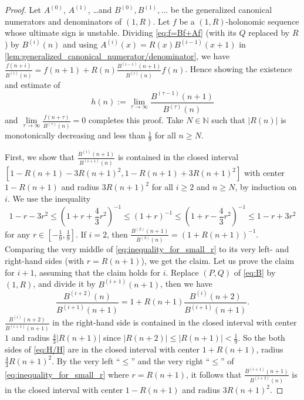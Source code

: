 \documentclass[a4paper,UKenglish,cleveref,autoref,thm-restate]{lipics-v2021}
\newcommand{\N}{\mathbb{N}}
\begin{document}
\begin{proof}
Let $A^{(0)}$, $A^{(1)}$, \dots and $B^{(0)}, B^{(1)}, \dots$ be the generalized canonical numerators and denominators of $(1,R)$. Let $f$ be a $(1, R)$-holonomic sequence whose ultimate sign is unstable. 
Dividing \cref{eq:f=Bf+Af} (with its $Q$ replaced by $R$) by $B^{(i)}(n)$ and using $A^{(i)}(x) = R(x) B^{(i-1)}(x+1)$ in \cref{lem:generalized_canonical_numerator/denominator}, we have $\frac{f(n+i)}{B^{(i)}(n)} = f(n+1) + R(n) \frac{B^{(i-1)}(n+1)}{B^{(i)}(n)} f(n)$. 
Hence showing the existence and estimate of
\begin{equation}\label{eq:h}
h(n) := \lim_{\tau \to \infty} \frac{B^{(\tau-1)}(n+1)}{B^{(\tau)}(n)}
\end{equation}
and $\lim\limits_{\tau \to \infty} \frac{f(n+\tau)}{B^{(\tau)}(n)} = 0$ completes this proof. Take $N \in \N$ such that $|R(n)|$ is monotonically decreasing and less than $\frac19$ for all $n \geq N$. 


First, we show that $\frac{B^{(i)}(n+1)}{B^{(i+1)}(n)}$ is contained in the closed interval $[ 1-R(n+1) - 3R(n+1)^2, 1-R(n+1) + 3R(n+1)^2 ]$ with center $1 - R(n+1)$ and radius $3R(n+1)^2$ for all $i \geq 2$ and $n \geq N$, by induction on $i$. We use the inequality
\begin{equation} \label{eq:inequality_for_small_r}
1 - r - 3r^2 \leq \left( 1+r+\frac43 r^2 \right)^{-1} \leq (1+r)^{-1} \leq \left( 1+r-\frac43 r^2 \right)^{-1} \leq 1 - r + 3r^2
\end{equation}
for any $r \in [-\frac19, \frac19]$. 
If $i=2$, then $\frac{B^{(2)}(n+1)}{B^{(3)}(n)} = (1 + R(n+1))^{-1}$. Comparing the very middle of \eqref{eq:inequality_for_small_r} to its very left- and right-hand sides (with $r=R(n+1)$), we get the claim. 
Let us prove the claim for $i+1$, assuming that the claim holds for $i$. 
Replace $(P, Q)$ of \eqref{eq:B} by $(1, R)$, and divide it by $B^{(i+1)}(n+1)$, then we have
\begin{equation} \label{eq:H/H}
\frac{B^{(i+2)}(n)}{B^{(i+1)}(n+1)} = 1 + R(n+1) \frac{B^{(i)}(n+2)}{B^{(i+1)}(n+1)}. 
\end{equation}
$\frac{B^{(i)}(n+2)}{B^{(i+1)}(n+1)}$ in the right-hand side is contained in the closed interval with center $1$ and radius $\frac43 |R(n+1)|$ since $|R(n+2)| \leq |R(n+1)| < \frac19$. 
So the both sides of \eqref{eq:H/H} are in the closed interval with center $1 + R(n+1)$, radius $\frac43 R(n+1)^2$. By the very left ``$\leq$'' and the very right ``$\leq$'' of \eqref{eq:inequality_for_small_r} where $r = R(n+1)$, it follows that $\frac{B^{(i+1)}(n+1)}{B^{(i+2)}(n)}$ is in the closed interval with center $1 - R(n+1)$ and radius $3R(n+1)^2$.


\end{proof}
\end{document}
